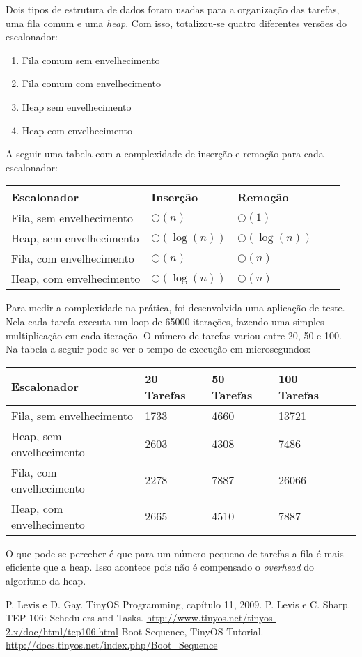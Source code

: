 \documentclass[a4paper,onecolumn, 10pt]{article}
\begin{document}
Dois tipos de estrutura de dados foram usadas para a organização das tarefas, uma fila comum e uma \textit{heap}. Com
isso, totalizou-se quatro diferentes versões do escalonador:
\begin{enumerate}
    \item Fila comum sem envelhecimento
    \item Fila comum com envelhecimento
    \item Heap sem envelhecimento
    \item Heap com envelhecimento
\end{enumerate}
A seguir uma tabela com a complexidade de inserção e remoção para cada escalonador:
\begin{center}
    \begin{tabular}{ | l | l | l | l | p{5cm} |}
    \hline
    Escalonador & Inserção & Remoção \\ \hline
    Fila, sem envelhecimento & $\bigcirc(n)$ & $\bigcirc(1)$ \\ \hline 
    Heap, sem envelhecimento & $\bigcirc(\log(n))$ & $\bigcirc(\log(n))$ \\ \hline
    Fila, com envelhecimento & $\bigcirc(n)$ & $\bigcirc(n)$ \\ \hline
    Heap, com envelhecimento & $\bigcirc(\log(n))$ & $\bigcirc(n)$ \\ \hline
    \end{tabular}
\end{center}
Para medir a complexidade na prática, foi desenvolvida uma aplicação de teste. Nela cada tarefa executa um loop de 65000
iterações, fazendo uma simples multiplicação em cada iteração. O número de tarefas variou entre 20, 50 e 100.
Na tabela a seguir pode-se ver o tempo de execução em microsegundos:
\begin{center}
    \begin{tabular}{ | l | l | l | l | p{5cm} |}
    \hline
    Escalonador              & 20 Tarefas & 50 Tarefas & 100 Tarefas \\ \hline
    Fila, sem envelhecimento & 1733 & 4660 & 13721 \\ \hline 
    Heap, sem envelhecimento & 2603 & 4308 & 7486 \\ \hline
    Fila, com envelhecimento & 2278 & 7887 & 26066 \\ \hline
    Heap, com envelhecimento & 2665 & 4510 & 7887 \\ \hline
    \end{tabular}
\end{center}
O que pode-se perceber é que para um número pequeno de tarefas a fila é mais eficiente que a heap. Isso acontece pois
não é compensado o \textit{overhead} do algoritmo da heap.
\pagebreak

\begin{thebibliography}{9}
 P. Levis e D. Gay. TinyOS Programming, capítulo 11, 2009.
 P. Levis e C. Sharp. TEP 106: Schedulers and Tasks.
                    \url{http://www.tinyos.net/tinyos-2.x/doc/html/tep106.html}
 Boot Sequence, TinyOS Tutorial. \url{http://docs.tinyos.net/index.php/Boot_Sequence}
\end{thebibliography}
\end{document}
